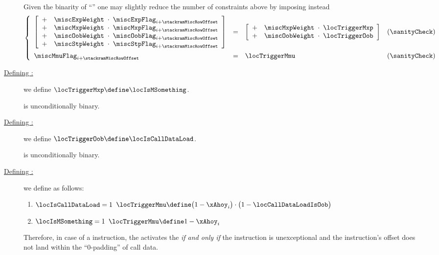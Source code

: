 \begin{description}
		\saNote{} \label{hub: instruction handling: stack ram: constraints: optimized misc flags}
		Given the binarity of ``\locTriggerXxx{}'' one may slightly reduce the number of constraints above by imposing instead
		\[
			\left\{ \begin{array}{lclr}
				\left[ \begin{array}{clcl}
					+   & \miscExpWeight & \!\!\!\cdot\!\!\! & \miscExpFlag _{i + \stackramMiscRowOffset} \\
					+   & \miscMxpWeight & \!\!\!\cdot\!\!\! & \miscMxpFlag _{i + \stackramMiscRowOffset} \\
					+   & \miscOobWeight & \!\!\!\cdot\!\!\! & \miscOobFlag _{i + \stackramMiscRowOffset} \\
					+   & \miscStpWeight & \!\!\!\cdot\!\!\! & \miscStpFlag _{i + \stackramMiscRowOffset} \\
				\end{array} \right]
				& = &
				\left[ \begin{array}{clcl}
					+ & \miscMxpWeight & \!\!\!\cdot\!\!\! & \locTriggerMxp \\
					+ & \miscOobWeight & \!\!\!\cdot\!\!\! & \locTriggerOob \\
				\end{array} \right]
				& (\sanityCheck) \vspace{2mm} \\
				\miscMmuFlag _{i + \stackramMiscRowOffset} & = & \locTriggerMmu & (\sanityCheck)              \\
			\end{array} \right.
		\]
	\item[\underline{Defining \locTriggerMxp{}:}]
		we define
		$\locTriggerMxp \define \locIsMSomething$.

		\saNote{}
		\locTriggerMxp{} is unconditionally binary.
	\item[\underline{Defining \locTriggerOob{}:}]
		we define
		$\locTriggerOob \define \locIsCallDataLoad$.

		\saNote{}
		\locTriggerOob{} is unconditionally binary.
	\item[\underline{Defining \locTriggerMmu{}:}]
		we define \locTriggerMmu{} as follows:
		\begin{enumerate}
			\item \If $\locIsCallDataLoad = 1$ \Then
				\(
					\locTriggerMmu \define
					\big( 1 -  \xAhoy_{i} \big)
					\cdot
					\big( 1 - \locCallDataLoadIsOob \big)
				\)
			\item \If $\locIsMSomething = 1$ \Then
				\(
					\locTriggerMmu \define
					1 - \xAhoy_{i}
				\)
		\end{enumerate}
		\saNote{}
		Therefore, in case of a  instruction,
		the \zkEvm{} activates the \mmuMod{} \emph{if and only if}
		the instruction is unexceptional and the instruction's offset does not land within the ``$0$-padding'' of call data.


\end{description}
